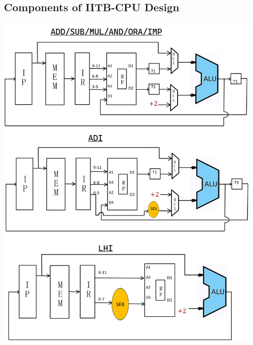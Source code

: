 \documentclass{article}
\begin{document}
\subsection{Components of IITB-CPU Design}
    \begin{center}
          \includegraphics[width = 0.99\linewidth]{Images/1.jpg}
      \end{center}
\end{document}
